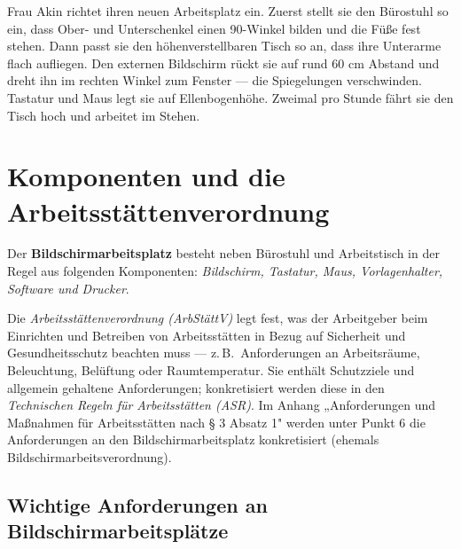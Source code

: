\documentclass[11pt, a4paper]{article}
\begin{document}
\begin{beispiel}
Frau Akin richtet ihren neuen Arbeitsplatz ein. Zuerst stellt sie den Bürostuhl so ein,
dass Ober- und Unterschenkel einen 90\textdegree-Winkel bilden und die Füße fest stehen.
Dann passt sie den höhenverstellbaren Tisch so an, dass ihre Unterarme flach aufliegen.
Den externen Bildschirm rückt sie auf rund 60 cm Abstand und dreht ihn im rechten Winkel
zum Fenster --- die Spiegelungen verschwinden. Tastatur und Maus legt sie auf
Ellenbogenhöhe. Zweimal pro Stunde fährt sie den Tisch hoch und arbeitet im Stehen.
\end{beispiel}

\section{Komponenten und die Arbeitsstättenverordnung}

Der \textbf{Bildschirmarbeitsplatz} besteht neben Bürostuhl und Arbeitstisch in der Regel
aus folgenden Komponenten: \emph{Bildschirm, Tastatur, Maus, Vorlagenhalter, Software und
Drucker}.

Die \emph{Arbeitsstättenverordnung (ArbStättV)} legt fest, was der Arbeitgeber beim
Einrichten und Betreiben von Arbeitsstätten in Bezug auf Sicherheit und Gesundheitsschutz
beachten muss --- z.\,B.\ Anforderungen an Arbeitsräume, Beleuchtung, Belüftung oder
Raumtemperatur. Sie enthält Schutzziele und allgemein gehaltene Anforderungen; konkretisiert
werden diese in den \emph{Technischen Regeln für Arbeitsstätten (ASR)}. Im Anhang
„Anforderungen und Maßnahmen für Arbeitsstätten nach § 3 Absatz 1" werden unter Punkt 6 die
Anforderungen an den Bildschirmarbeitsplatz konkretisiert (ehemals Bildschirmarbeitsverordnung).

\subsection{Wichtige Anforderungen an Bildschirmarbeitsplätze}
\end{document}
